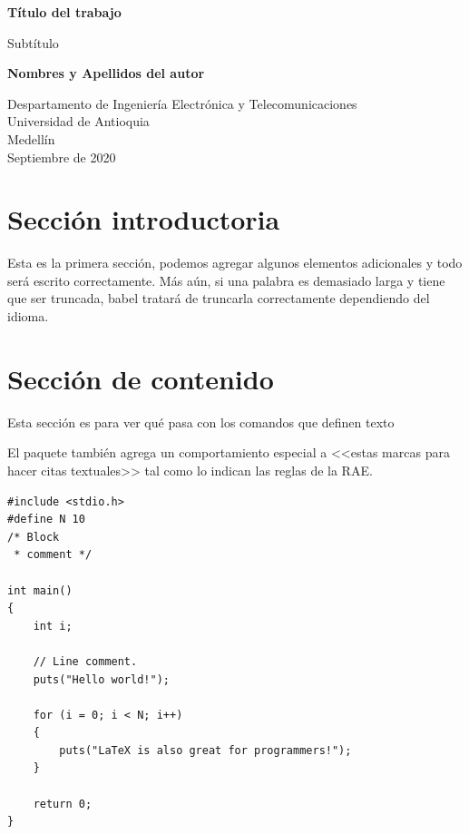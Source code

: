 \documentclass{article}
\begin{document}
\begin{titlepage}
    \begin{center}
        \vspace*{1cm}
            
        \Huge
        \textbf{Título del trabajo}
            
        \vspace{0.5cm}
        \LARGE
        Subtítulo
            
        \vspace{1.5cm}
            
        \textbf{Nombres y Apellidos del autor}
            
        \vfill
            
        \vspace{0.8cm}
            
        \Large
        Despartamento de Ingeniería Electrónica y Telecomunicaciones\\
        Universidad de Antioquia\\
        Medellín\\
        Septiembre de 2020
            
    \end{center}
\end{titlepage}

\tableofcontents

\section{Sección introductoria}
Esta es la primera sección, podemos agregar algunos elementos adicionales y todo será escrito correctamente. Más aún, si una palabra es demasiado larga y tiene que ser truncada, babel tratará de truncarla correctamente dependiendo del idioma.

\section{Sección de contenido} \label{contenido}

Esta sección es para ver qué pasa con los comandos 
que definen texto

El paquete también agrega un comportamiento especial 
a <<estas marcas para hacer citas textuales>> tal como 
lo indican las reglas de la RAE. \cite{dirac}

\begin{lstlisting}
#include <stdio.h>
#define N 10
/* Block
 * comment */

int main()
{
    int i;

    // Line comment.
    puts("Hello world!");
    
    for (i = 0; i < N; i++)
    {
        puts("LaTeX is also great for programmers!");
    }

    return 0;
}
\end{lstlisting}
\end{document}
